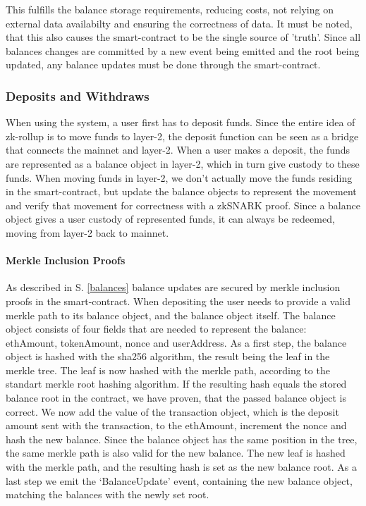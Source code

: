 \documentclass[../../thesis.tex]{subfiles}
\begin{document}
This fulfills the balance storage requirements, reducing costs, not relying on external data availabilty and ensuring the correctness of data. It must be noted, that this also causes the smart-contract to be the single source of 'truth'. Since all balances changes are committed by a new event being emitted and the root being updated, any balance updates must be done through the smart-contract.

\subsubsection{Deposits and Withdraws} \label{dep_with}
When using the system, a user first has to deposit funds. Since the entire idea of zk-rollup is to move funds to layer-2, the deposit function can be seen as a bridge that connects the mainnet and layer-2. When a user makes a deposit, the funds are represented as a balance object in layer-2, which in turn give custody to these funds. When moving funds in layer-2, we don't actually move the funds residing in the smart-contract, but update the balance objects to represent the movement and verify that movement for correctness with a zkSNARK proof. Since a balance object gives a user custody of represented funds, it can always be redeemed, moving from layer-2 back to mainnet.  

\paragraph{Merkle Inclusion Proofs}
As described in S. \ref{balances} balance updates are secured by merkle inclusion proofs in the smart-contract. When depositing the user needs to provide a valid merkle path to its balance object, and the balance object itself. The balance object consists of four fields that are needed to represent the balance: ethAmount, tokenAmount, nonce and userAddress. As a first step, the balance object is hashed with the sha256 algorithm, the result being the leaf in the merkle tree. The leaf is now hashed with the merkle path, according to the standart merkle root hashing algorithm. If the resulting hash equals the stored balance root in the contract, we have proven, that the passed balance object is correct. We now add the value of the transaction object, which is the deposit amount sent with the transaction, to the ethAmount, increment the nonce and hash the new balance. Since the balance object has the same position in the tree, the same merkle path is also valid for the new balance. The new leaf is hashed with the merkle path, and the resulting hash is set as the new balance root. As a last step we emit the `BalanceUpdate' event, containing the new balance object, matching the balances with the newly set root. 
\end{document}
